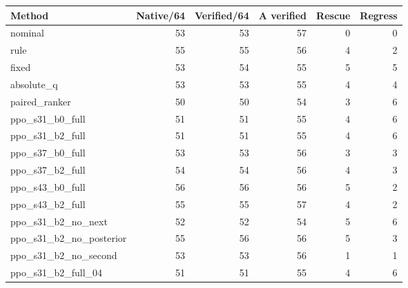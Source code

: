 \begin{tabular}{lrrrrr}
\toprule
Method & Native/64 & Verified/64 & A verified & Rescue & Regress\\
\midrule
nominal & 53 & 53 & 57 & 0 & 0 \\
rule & 55 & 55 & 56 & 4 & 2 \\
fixed & 53 & 54 & 55 & 5 & 5 \\
absolute\_q & 53 & 53 & 55 & 4 & 4 \\
paired\_ranker & 50 & 50 & 54 & 3 & 6 \\
ppo\_s31\_b0\_full & 51 & 51 & 55 & 4 & 6 \\
ppo\_s31\_b2\_full & 51 & 51 & 55 & 4 & 6 \\
ppo\_s37\_b0\_full & 53 & 53 & 56 & 3 & 3 \\
ppo\_s37\_b2\_full & 54 & 54 & 56 & 4 & 3 \\
ppo\_s43\_b0\_full & 56 & 56 & 56 & 5 & 2 \\
ppo\_s43\_b2\_full & 55 & 55 & 57 & 4 & 2 \\
ppo\_s31\_b2\_no\_next & 52 & 52 & 54 & 5 & 6 \\
ppo\_s31\_b2\_no\_posterior & 55 & 56 & 56 & 5 & 3 \\
ppo\_s31\_b2\_no\_second & 53 & 53 & 56 & 1 & 1 \\
ppo\_s31\_b2\_full\_04 & 51 & 51 & 55 & 4 & 6 \\
\bottomrule
\end{tabular}
